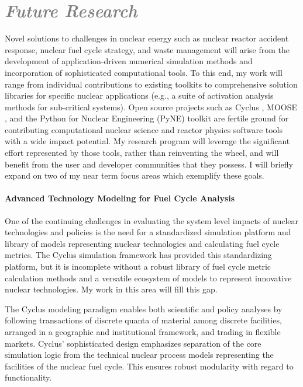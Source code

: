 \documentclass[a4paper, 10pt]{article}
\begin{document}
\section*{\textcolor{gray}{\it Future Research}}
Novel solutions to challenges in nuclear energy such as nuclear reactor accident 
response, nuclear fuel cycle strategy, and waste management will arise from the  
development of application-driven numerical simulation methods and incorporation 
of sophisticated computational tools. To this end, my work will range from 
individual contributions to existing toolkits to comprehensive solution 
libraries for specific nuclear applications (e.g., a suite of activation 
analysis methods for sub-critical systems). Open source projects such as 
Cyclus \cite{huff_cyclus_2011}, MOOSE \cite{gaston_moose:_2009}, and the Python 
for Nuclear Engineering (PyNE) toolkit \cite{pyne_pyne_2011} are fertile ground 
for contributing computational nuclear science and reactor physics software 
tools with a wide impact potential. My research program will leverage the 
significant effort represented by those tools, rather than reinventing the 
wheel, and will benefit from the user and developer communities that they 
possess.  I will briefly expand on two of my near term focus areas which 
exemplify these goals. 

\paragraph{Advanced Technology Modeling for Fuel Cycle Analysis} 

One of the continuing challenges in evaluating the system level impacts of 
nuclear technologies and policies is the need for a standardized simulation 
platform and library of models representing nuclear technologies and calculating 
fuel cycle metrics.  The Cyclus simulation framework 
has provided this standardizing platform, but it is incomplete without a 
robust library of fuel cycle metric calculation methods and a versatile ecosystem of 
models to represent innovative nuclear technologies. My work in this area will 
fill this gap. 

The Cyclus modeling paradigm enables both scientific and policy analyses by 
following transactions of discrete quanta of material among discrete facilities, 
arranged in a geographic and institutional framework, and trading in flexible 
markets. Cyclus' sophisticated design emphasizes separation of the core simulation logic 
from the technical nuclear process models representing the facilities of the 
nuclear fuel cycle. This ensures robust modularity with regard to functionality.  
\end{document}
